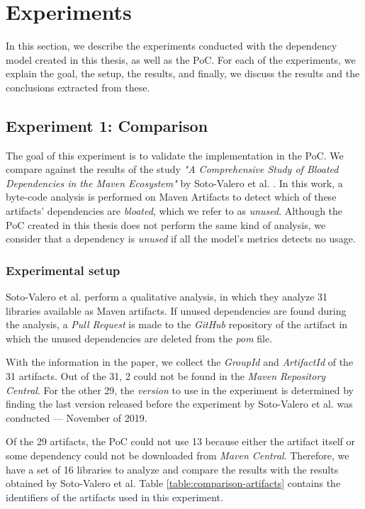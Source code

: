 \chapter{Experiments}\label{ch:Experiments}
In this section, we describe the experiments conducted with the dependency model created in this thesis, as well as the PoC. For each of the experiments, we explain the goal, the setup, the results, and finally, we discuss the results and the conclusions extracted from these.

\section{Experiment 1: Comparison}\label{sec:Exp1}
The goal of this experiment is to validate the implementation in the PoC. We compare against the results of the study \textit{"A Comprehensive Study of Bloated Dependencies in the Maven Ecosystem"} by Soto-Valero et al. \cite{soto2020comprehensive}. In this work, a byte-code analysis is performed on Maven Artifacts to detect which of these artifacts' dependencies are \textit{bloated}, which we refer to as \textit{unused}. Although the PoC created in this thesis does not perform the same kind of analysis, we consider that a dependency is \textit{unused} if all the model's metrics detects no usage.

\subsection{Experimental setup}
Soto-Valero et al. perform a qualitative analysis, in which they analyze 31 libraries available as Maven artifacts. If unused dependencies are found during the analysis, a \textit{Pull Request} is made to the \textit{GitHub} repository of the artifact in which the unused dependencies are deleted from the \textit{pom} file.

With the information in the paper, we collect the \textit{GroupId} and \textit{ArtifactId} of the 31 artifacts. Out of the 31, 2 could not be found in the \textit{Maven Repository Central}. For the other 29, the \textit{version} to use in the experiment is determined by finding the last version released before the experiment by Soto-Valero et al. was conducted --- November of 2019.

Of the 29 artifacts, the PoC could not use 13 because either the artifact itself or some dependency could not be downloaded from \textit{Maven Central}. Therefore, we have a set of 16 libraries to analyze and compare the results with the results obtained by Soto-Valero et al. Table \ref{table:comparison-artifacts} contains the identifiers of the artifacts used in this experiment.

